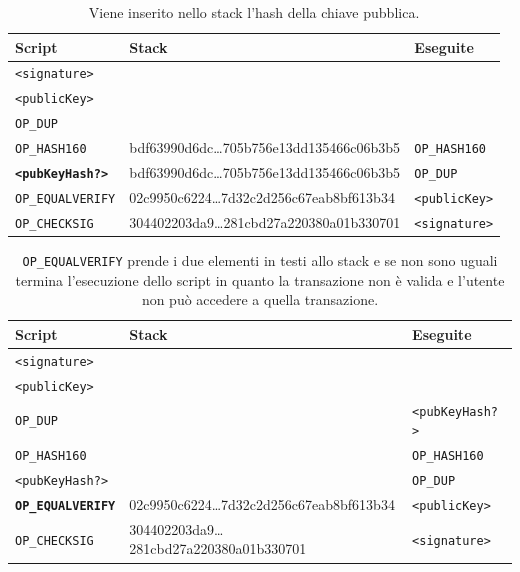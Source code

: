 \begin{enumerate}[1.]
\begin{table}[H]
    \centering
    \begin{tabular}{p{3cm}|p{7.7cm}|p{3cm}}
        Script & Stack & Eseguite\\
        \hline
        \texttt{<signature>}            & &\\
        \texttt{<publicKey>}            & &\\
        \texttt{OP\_DUP}                & &\\
        \texttt{OP\_HASH160}            & bdf63990d6dc\dots705b756e13dd135466c06b3b5 & \texttt{OP\_HASH160}\\
        \texttt{\textbf{<pubKeyHash?>}} & bdf63990d6dc\dots705b756e13dd135466c06b3b5 & \texttt{OP\_DUP}\\
        \texttt{OP\_EQUALVERIFY}        & 02c9950c6224\dots7d32c2d256c67eab8bf613b34 & \texttt{<publicKey>}\\
        \texttt{OP\_CHECKSIG}           & 304402203da9\dots281cbd27a220380a01b330701 & \texttt{<signature>}\\
    \end{tabular}
    \caption{Viene inserito nello stack l'hash della chiave pubblica.}
\end{table}

\begin{table}[H]
    \centering
    \begin{tabular}{p{3cm}|p{7.7cm}|p{3cm}}
        Script & Stack & Eseguite\\
        \hline
        \texttt{<signature>}              & &\\
        \texttt{<publicKey>}              & &\\
        \texttt{OP\_DUP}                  &                                            & \texttt{<pubKeyHash?>}\\
        \texttt{OP\_HASH160}              &                                            & \texttt{OP\_HASH160}\\
        \texttt{<pubKeyHash?>}            &                                            & \texttt{OP\_DUP}\\
        \texttt{\textbf{OP\_EQUALVERIFY}} & 02c9950c6224\dots7d32c2d256c67eab8bf613b34 & \texttt{<publicKey>}\\
        \texttt{OP\_CHECKSIG}             & 304402203da9\dots281cbd27a220380a01b330701 & \texttt{<signature>}\\
    \end{tabular}
    \caption{\texttt{OP\_EQUALVERIFY} prende i due elementi in testi allo stack e se non sono uguali termina l'esecuzione dello script in quanto la transazione non è valida e l'utente non può accedere a quella transazione.}
\end{table}


\end{enumerate}
